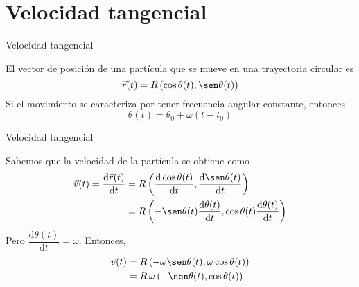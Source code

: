 \documentclass[11pt,handout,aspectratio=1610]{beamer}
\newcommand{\fdiff}[2]{\dfrac{\text{d} #1}{\text{d} #2}}
\begin{document}
\section{Velocidad tangencial}

\begin{frame}{Velocidad tangencial}

    El vector de posición de una partícula que se mueve en una trayectoria circular es $$\vec{r} (t) = R \left(\cos \theta (t), \sen \theta (t)\right)$$ \pause Si el movimiento se caracteriza por tener frecuencia angular constante, entonces $$\theta (t) = \theta_0 + \omega \left( t - t_0\right)$$ 

\end{frame}

\begin{frame}{Velocidad tangencial}

    Sabemos que la velocidad de la partícula se obtiene como
    \begin{equation*}
        \begin{split}
            \vec{v} (t) = \fdiff{\vec{r}(t)}{t} &= R \left(\fdiff{\cos \theta (t)}{t}, \fdiff{\sen \theta (t)}{t}\right) \\ 
            &= R \left(-\sen \theta (t) \fdiff{\theta (t)}{t}, \cos \theta (t) \fdiff{\theta (t)}{t}\right)
        \end{split}
    \end{equation*} \pause Pero $\fdiff{\theta (t)}{t} = \omega$. \pause Entonces,
    \begin{equation*}
        \begin{split}
            \vec{v} (t) &= R \left(- \omega \sen \theta (t), \omega \cos \theta (t)\right) \\
                        &= R \, \omega \left(- \sen \theta (t), \cos \theta (t)\right)
        \end{split}
    \end{equation*}

\end{frame}
\end{document}
